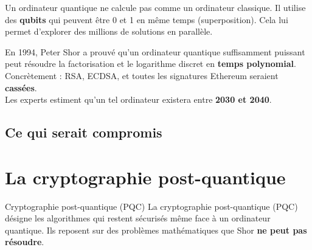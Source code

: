 \documentclass[12pt, a4paper]{article}
\begin{document}
Un ordinateur quantique ne calcule pas comme un ordinateur classique.
Il utilise des \textbf{qubits} qui peuvent être 0 et 1 en même temps (superposition).
Cela lui permet d'explorer des millions de solutions en parallèle.

\begin{danger}
En 1994, Peter Shor a prouvé qu'un ordinateur quantique suffisamment puissant peut
résoudre la factorisation et le logarithme discret en \textbf{temps polynomial}.\\[0.2cm]
Concrètement : RSA, ECDSA, et toutes les signatures Ethereum seraient \textbf{cassées}.\\[0.2cm]
Les experts estiment qu'un tel ordinateur existera entre \textbf{2030 et 2040}.
\end{danger}

\subsection{Ce qui serait compromis}

\begin{center}
\end{center}

\section{La cryptographie post-quantique}

\begin{definition}{Cryptographie post-quantique (PQC)}
La cryptographie post-quantique (PQC) désigne les algorithmes qui restent sécurisés
même face à un ordinateur quantique. Ils reposent sur des problèmes mathématiques
que Shor \textbf{ne peut pas résoudre}.
\end{definition}
\end{document}
